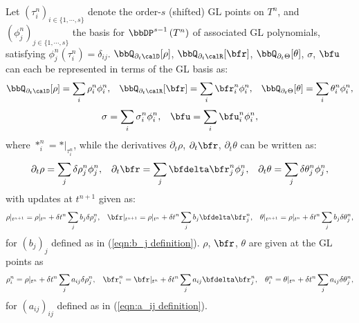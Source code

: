 \begin{example}
        Let $\left(\tau^{n}_{i}\right)_{i \in \{1, \cdots, s\}}$ denote the order-$s$ (shifted) GL points on $T^{n}$, and $\left(\phi^{n}_{j}\right)_{j \in \{1, \cdots, s\}}$ the basis for $\bbDP^{s - 1}\left(T^{n}\right)$ of associated GL polynomials, satisfying $\phi^{n}_{j}(\tau^{n}_{i}) = \delta_{ij}$. $\bbQ_{\partial_{t}\calD}[\rho]$, $\bbQ_{\partial_{t}\calR}[\bfr]$, $\bbQ_{\partial_{t}\Theta}[\theta]$, $\sigma$, $\bfu$ can each be represented in terms of the GL basis as:
        \begin{align}
            \bbQ_{\partial_{t}\calD}[\rho]     =  \sum_{i}\rho_{i}^{n}\phi_{i}^{n},  &&
            \bbQ_{\partial_{t}\calR}[\bfr]     =  \sum_{i}\bfr_{i}^{n}\phi_{i}^{n},  &&
            \bbQ_{\partial_{t}\Theta}[\theta]  =  \sum_{i}\theta_{i}^{n}\phi_{i}^{n},
        \end{align}
        \vspace{- 7mm}
        \begin{align}
            \sigma = \sum_{i}\sigma_{i}^{n}\phi_{i}^{n},  &&
            \bfu   = \sum_{i}\bfu_{i}^{n}\phi_{i}^{n},
        \end{align}
        where $*_{i}^{n} = *|_{\tau_{i}^{n}}$, while the derivatives $\partial_{t}\rho$, $\partial_{t}\bfr$, $\partial_{t}\theta$ can be written as:
        \begin{align}
            \partial_{t}\rho    =  \sum_{j}\delta\rho_{j}^{n}\phi_{j}^{n},  &&
            \partial_{t}\bfr    =  \sum_{j}\bfdelta\bfr_{j}^{n}\phi_{j}^{n},  &&
            \partial_{t}\theta  =  \sum_{j}\delta\theta_{j}^{n}\phi_{j}^{n},
        \end{align}
        with updates at $t^{n + 1}$ given as:
        \begin{align}
            \rho|_{t^{n + 1}}    =  \rho|_{t^{n}} + \delta t^{n}\sum_{j}b_{j}\delta\rho_{j}^{n},  &&
            \bfr|_{t^{n + 1}}    =  \rho|_{t^{n}} + \delta t^{n}\sum_{j}b_{j}\bfdelta\bfr_{j}^{n},  &&
            \theta|_{t^{n + 1}}  =  \rho|_{t^{n}} + \delta t^{n}\sum_{j}b_{j}\delta\theta_{j}^{n},
        \end{align}
        for $(b_{j})_{j}$ defined as in (\ref{eqn:b_j definition}). $\rho$, $\bfr$, $\theta$ are given at the GL points as
        \begin{align}
            \rho_{i}^{n}    =  \rho|_{t^{n}}   + \delta t^{n}\sum_{j}a_{ij}\delta\rho^{n}_{j},  &&
            \bfr_{i}^{n}    =  \bfr|_{t^{n}}   + \delta t^{n}\sum_{j}a_{ij}\bfdelta\bfr^{n}_{j},  &&
            \theta_{i}^{n}  =  \theta|_{t^{n}} + \delta t^{n}\sum_{j}a_{ij}\delta\theta^{n}_{j},
        \end{align}
        for $(a_{ij})_{ij}$ defined as in (\ref{eqn:a_ij definition}).


\end{example}

